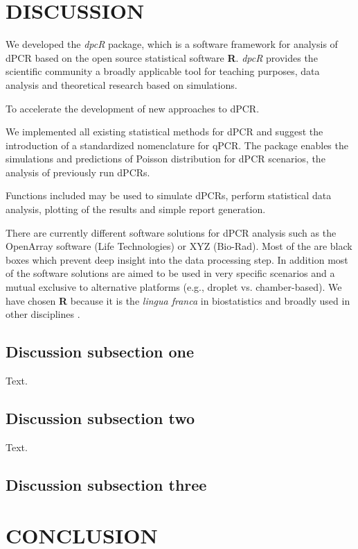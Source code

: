 \documentclass[a4,center,fleqn]{NAR}
\begin{document}
\section{DISCUSSION}

We developed the \textit{dpcR} package, which is a software framework for analysis of 
dPCR based on the open source statistical software \textbf{R}. \textit{dpcR} provides the scientific 
community a broadly applicable tool for teaching purposes, data analysis and theoretical research based on simulations. 

To accelerate the development of new approaches to dPCR. 

We implemented all existing statistical methods for dPCR and suggest the 
introduction of a standardized nomenclature for qPCR. The package enables the 
simulations and predictions of Poisson distribution for dPCR scenarios, the 
analysis of previously run dPCRs.

Functions included may be used to simulate dPCRs, perform statistical data 
analysis, plotting of the results and simple report generation. 

There are currently different software solutions for dPCR analysis such as the 
OpenArray software (Life Technologies) or XYZ (Bio-Rad). Most of the are black 
boxes which prevent deep insight into the data processing step. In addition most 
of the software solutions are aimed to be used in very specific scenarios and a 
mutual exclusive to alternative platforms (e.g., droplet vs. chamber-based). We 
have chosen \textbf{R} because it is the \textit{lingua franca} in biostatistics and broadly used 
in other disciplines \cite{rodiger_r_2015}.

\subsection{Discussion subsection one}

Text.


\subsection{Discussion subsection two}

Text.


\subsection{Discussion subsection three}


\section{CONCLUSION}
\end{document}
